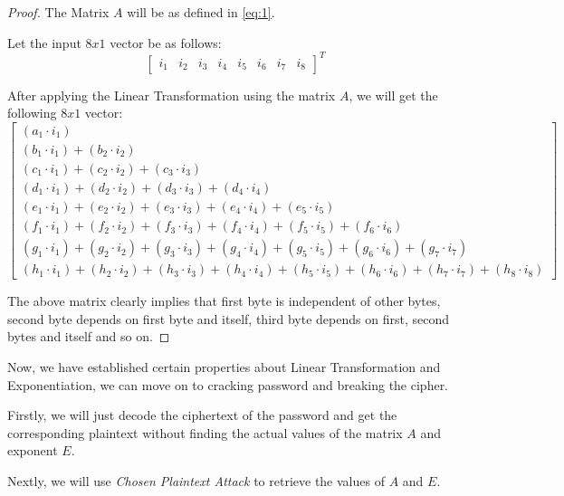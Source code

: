 \documentclass[10pt,twoside]{article}
\begin{document}
\begin{proof}
  The Matrix $A$ will be as defined in \cref{eq:1}. \newline

  Let the input $8x1$ vector be as follows:
  $$\begin{bmatrix}
    i_1 & i_2 & i_3 & i_4 & i_5 & i_6 & i_7 & i_8
  \end{bmatrix}^T$$

  After applying the Linear Transformation using the matrix $A$, we will get the following $8x1$ vector:
  $$\begin{bmatrix}
    (a_1\cdot i_1) \\
    (b_1\cdot i_1) + (b_2\cdot i_2) \\
    (c_1\cdot i_1) + (c_2\cdot i_2) + (c_3\cdot i_3) \\
    (d_1\cdot i_1) + (d_2\cdot i_2) + (d_3\cdot i_3) + (d_4\cdot i_4)\\
    (e_1\cdot i_1) + (e_2\cdot i_2) + (e_3\cdot i_3) + (e_4\cdot i_4) + (e_5\cdot i_5)\\
    (f_1\cdot i_1) + (f_2\cdot i_2) + (f_3\cdot i_3) + (f_4\cdot i_4) + (f_5\cdot i_5) + (f_6\cdot i_6)\\
    (g_1\cdot i_1) + (g_2\cdot i_2) + (g_3\cdot i_3) + (g_4\cdot i_4) + (g_5\cdot i_5) + (g_6\cdot i_6) + (g_7\cdot i_7)\\
    (h_1\cdot i_1) + (h_2\cdot i_2) + (h_3\cdot i_3) + (h_4\cdot i_4) + (h_5\cdot i_5) + (h_6\cdot i_6) + (h_7\cdot i_7) + (h_8\cdot i_8)
  \end{bmatrix}$$

  The above matrix clearly implies that first byte is independent of other bytes, second byte depends on first byte and itself, third byte depends on first, second bytes and itself and so on. \newline

\end{proof}

Now, we have established certain properties about Linear Transformation and Exponentiation, we can move on to cracking password and breaking the cipher. \newline

Firstly, we will just decode the ciphertext of the password and get the corresponding plaintext without finding the actual values of the matrix $A$ and exponent $E$. \newline

Nextly, we will use \textit{Chosen Plaintext Attack} to retrieve the values of $A$ and $E$.
\end{document}
